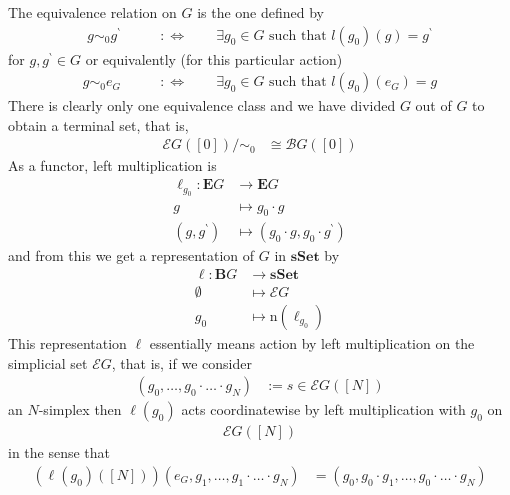 The equivalence relation on $G$ is the one defined by
\begin{align*}
  g
  \sim_{0}
  g^{\backprime}
  \qquad
  &:\Leftrightarrow
  \qquad
  \exists
  g_{0}
  \in
  G
  \text{ such that }
  l(g_{0})(g)
  =
  g^{\backprime}
\end{align*}
for $g,g^{\backprime} \in G$ or equivalently (for this particular action)
\begin{align*}
  g
  \sim_{0}
  e_{G}
  \qquad
  &:\Leftrightarrow
  \qquad
  \exists
  g_{0}
  \in
  G
  \text{ such that }
  l(g_{0})(e_{G})
  =
  g
\end{align*}
There is clearly only one equivalence class and we have divided $G$ out of $G$ to obtain a terminal set, that is,
\begin{align*}
  \mathcal{E}G
  \left(
    [0]
  \right)
  \slash
  \sim_{0}
  &\cong
  \mathcal{B}G
  \left(
    [0]
  \right)
\end{align*}
As a functor, left multiplication is
\begin{align*}
  \ell_{g_{0}}
  \colon
  \mathbf{E}G
  &\rightarrow
  \mathbf{E}G
  \\
  g
  &\mapsto
  g_{0}
  \cdot
  g
  \\
  \left(
    g,
    g^{\backprime}
  \right)
  &\mapsto
  \left(
    g_{0}
    \cdot
    g,
    g_{0}
    \cdot
    g^{\backprime}
  \right)
\end{align*}
and from this we get a representation of $G$ in $\mathbf{sSet}$ by
\begin{align*}
  \ell
  \colon
  \mathbf{B}G
  &\rightarrow
  \mathbf{sSet}
  \\
  \emptyset
  &\mapsto
  \mathcal{E}G
  \\
  g_{0}
  &\mapsto
  \mathrm{n}
  \left(
    \ell_{g_{0}}
  \right)
\end{align*}
This representation $\ell$ essentially means action by left multiplication on the simplicial set $\mathcal{E}G$, that is, if we consider
\begin{align*}
  \left(
    g_{0},
    \ldots,
    g_{0}
    \cdot
    \ldots
    \cdot
    g_{N}
  \right)
  &:=
  s
  \in
  \mathcal{E}G
  \left(
    [N]
  \right)
\end{align*}
an $N$-simplex then $\ell(g_{0})$ acts coordinatewise by left multiplication with $g_{0}$ on
\begin{align*}
  \mathcal{E}G
  \left(
    [N]
  \right)
\end{align*}
in the sense that
\begin{align*}
  \left(
    \ell(g_{0})
    \left(
      [N]
    \right)
  \right)
  \left(
    e_{G},
    g_{1},
    \ldots,
    g_{1}
    \cdot
    \ldots
    \cdot
    g_{N}
  \right)
  &=
  \left(
    g_{0},
    g_{0}
    \cdot
    g_{1},
    \ldots,
    g_{0}
    \cdot
    \ldots
    \cdot
    g_{N}
  \right)
\end{align*}
